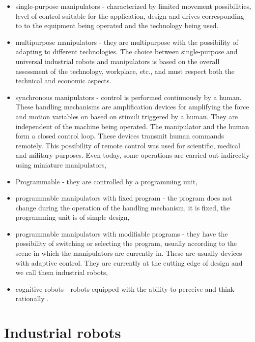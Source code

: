 \begin{itemize}

    \item  single-purpose manipulators - characterized by limited movement possibilities, level of control suitable for the application, design and drives corresponding to
to the equipment being operated and the technology being used. 

    \item multipurpose manipulators - they are multipurpose with the possibility of adapting to different technologies. The choice between single-purpose and universal industrial robots and manipulators is based on the overall assessment of the technology, workplace, etc., and must respect both the technical and economic aspects. 

    \item  synchronous manipulators - control is performed continuously by a human. These handling mechanisms are amplification devices for amplifying the force and motion variables on based on stimuli triggered by a human. They are independent of the machine being operated. The manipulator and the human form a closed control loop. These devices transmit human commands remotely. This possibility of remote control was used for scientific, medical and military purposes. Even today, some operations are carried out indirectly using miniature manipulators, 

    \item  Programmable - they are controlled by a programming unit,

    \item  programmable manipulators with fixed program - the program does not change during the operation of the handling mechanism, it is fixed, the programming unit is of simple design, 

    \item  programmable manipulators with modifiable programs - they have the possibility of switching or selecting the program, usually according to the scene in which the manipulators are currently in. These are usually devices with adaptive control. They are currently at the cutting edge of design and we call them industrial robots,

    \item  cognitive robots - robots equipped with the ability to perceive and think rationally \cite{vsb_2007}.

\end{itemize}

\section{Industrial robots}

